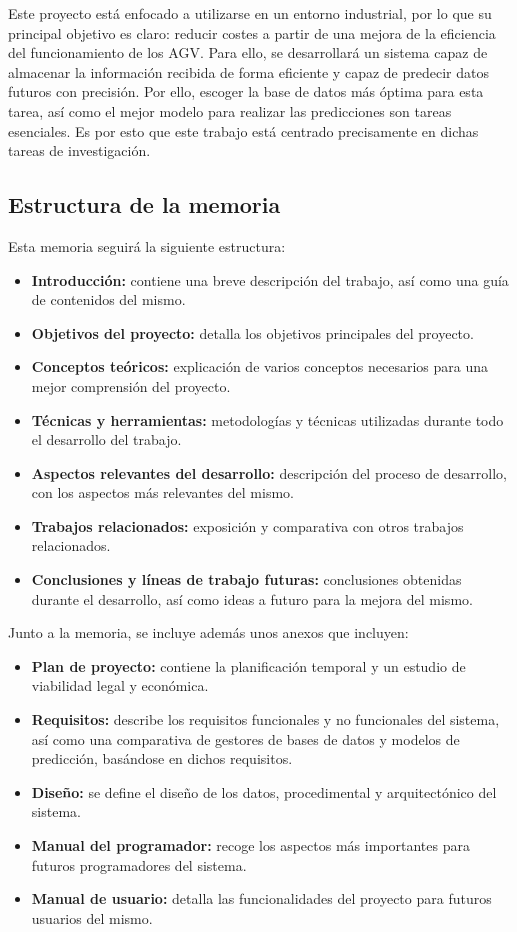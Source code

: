 Este proyecto está enfocado a utilizarse en un entorno industrial, por lo que su principal objetivo es claro:
reducir costes a partir de una mejora de la eficiencia del funcionamiento de los AGV. Para ello, se desarrollará 
un sistema capaz de almacenar la información recibida de forma eficiente y capaz de predecir datos futuros con 
precisión. Por ello, escoger la base de datos más óptima para esta tarea, así como el mejor modelo para realizar
las predicciones son tareas esenciales. Es por esto que este trabajo está centrado precisamente en dichas 
tareas de investigación.

\subsection{Estructura de la memoria}

Esta memoria seguirá la siguiente estructura:
\begin{itemize}
    \item \textbf{Introducción:} contiene una breve descripción del trabajo, así como una guía de contenidos del mismo.
    \item \textbf{Objetivos del proyecto:} detalla los objetivos principales del proyecto.
    \item \textbf{Conceptos teóricos:} explicación de varios conceptos necesarios para una mejor comprensión del
        proyecto.
    \item \textbf{Técnicas y herramientas:} metodologías y técnicas utilizadas durante todo el desarrollo del 
        trabajo.
    \item \textbf{Aspectos relevantes del desarrollo:} descripción del proceso de desarrollo, con los aspectos
        más relevantes del mismo.
    \item \textbf{Trabajos relacionados:} exposición y comparativa con otros trabajos relacionados.
    \item \textbf{Conclusiones y líneas de trabajo futuras:} conclusiones obtenidas durante el desarrollo, así
        como ideas a futuro para la mejora del mismo.
\end{itemize}

Junto a la memoria, se incluye además unos anexos que incluyen:
\begin{itemize}
    \item \textbf{Plan de proyecto:} contiene la planificación temporal y un estudio de viabilidad legal y
        económica.
    \item \textbf{Requisitos:} describe los requisitos funcionales y no funcionales del sistema, así como una
        comparativa de gestores de bases de datos y modelos de predicción, basándose en dichos requisitos.
    \item \textbf{Diseño:} se define el diseño de los datos, procedimental y arquitectónico del sistema.
    \item \textbf{Manual del programador:} recoge los aspectos más importantes para futuros programadores del sistema.
    \item \textbf{Manual de usuario:} detalla las funcionalidades del proyecto para futuros usuarios del
        mismo.
\end{itemize}

